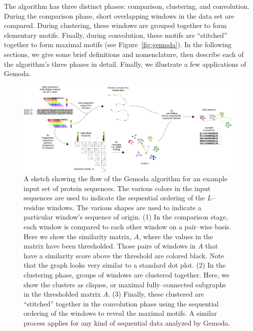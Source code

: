     The algorithm has three distinct phases:
    comparison, clustering, and convolution.  During the
    comparison phase, short overlapping windows in the data
    set are compared.  During clustering, these windows
    are grouped together to form elementary motifs.
    Finally, during convolution, these motifs
    are ``stitched'' together to form maximal motifs (see
    Figure~\vref{fig:gemoda}).  In the following sections,
    we give some brief definitions and nomenclature,
    then describe each of the algorithm's three phases
    in detail.  Finally, we illustrate a few applications
    of Gemoda.


    \begin{figure}
        \centering
        \includegraphics[width=\textheight]{Body/Images-chap3/gemoda_fig5.pdf}
        \caption[A sketch showing the flow of the Gemoda algorithm
            for an example input set of protein sequences.]{A sketch showing the flow of the Gemoda algorithm
            for an example input set of protein sequences.
            The various colors in the input sequences are used
            to indicate the sequential ordering of the $L$--residue
            windows.  The various shapes are used to indicate
            a particular window's sequence of origin.  (1) In the
            comparison stage, each window is compared to each
            other window on a pair--wise basis.  Here we show
            the similarity matrix, $A$, where the values in the
            matrix have been thresholded.  Those pairs of windows
            in $A$ that have a similarity score above the threshold
            are colored black.  Note that the graph looks very
            similar to a standard dot plot.  (2) In the clustering
            phase, groups of windows are clustered together.
            Here, we show the clusters as cliques, or maximal
            fully--connected subgraphs in the thresholded matrix
            $A$.  (3) Finally, these clustered are ``stitched'' together
            in the convolution phase using the sequential ordering
            of the windows to reveal the maximal motifs.
            A similar process
            applies for any kind of sequential data analyzed by
            Gemoda.
        }\label{fig:gemoda}
    \end{figure}

